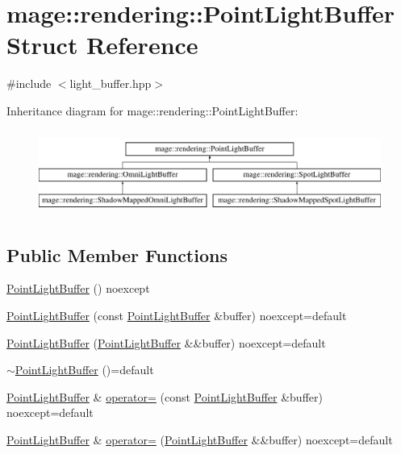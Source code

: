 \hypertarget{structmage_1_1rendering_1_1_point_light_buffer}{}\section{mage\+:\+:rendering\+:\+:Point\+Light\+Buffer Struct Reference}
\label{structmage_1_1rendering_1_1_point_light_buffer}


{\ttfamily \#include $<$light\+\_\+buffer.\+hpp$>$}

Inheritance diagram for mage\+:\+:rendering\+:\+:Point\+Light\+Buffer\+:\begin{figure}[H]
\begin{center}
\leavevmode
\includegraphics[height=2.809365cm]{structmage_1_1rendering_1_1_point_light_buffer}
\end{center}
\end{figure}
\subsection*{Public Member Functions}
\begin{DoxyCompactItemize}
\item 
\mbox{\hyperlink{structmage_1_1rendering_1_1_point_light_buffer_a1b1cfb7f21b62216c1cf827a4b5ecb0b}{Point\+Light\+Buffer}} () noexcept
\item 
\mbox{\hyperlink{structmage_1_1rendering_1_1_point_light_buffer_ae6ba19d082d27864c4547f220f5fbaf5}{Point\+Light\+Buffer}} (const \mbox{\hyperlink{structmage_1_1rendering_1_1_point_light_buffer}{Point\+Light\+Buffer}} \&buffer) noexcept=default
\item 
\mbox{\hyperlink{structmage_1_1rendering_1_1_point_light_buffer_aabaa7e2bfbbf2c43aa2658f363f2c81e}{Point\+Light\+Buffer}} (\mbox{\hyperlink{structmage_1_1rendering_1_1_point_light_buffer}{Point\+Light\+Buffer}} \&\&buffer) noexcept=default
\item 
\mbox{\hyperlink{structmage_1_1rendering_1_1_point_light_buffer_ab96d8eab3de782d20ae4cf239c2d45f9}{$\sim$\+Point\+Light\+Buffer}} ()=default
\item 
\mbox{\hyperlink{structmage_1_1rendering_1_1_point_light_buffer}{Point\+Light\+Buffer}} \& \mbox{\hyperlink{structmage_1_1rendering_1_1_point_light_buffer_a0464569c115507da0733a185e8968c46}{operator=}} (const \mbox{\hyperlink{structmage_1_1rendering_1_1_point_light_buffer}{Point\+Light\+Buffer}} \&buffer) noexcept=default
\item 
\mbox{\hyperlink{structmage_1_1rendering_1_1_point_light_buffer}{Point\+Light\+Buffer}} \& \mbox{\hyperlink{structmage_1_1rendering_1_1_point_light_buffer_a8bdda9a12643bc11f03798ed3e6b49f4}{operator=}} (\mbox{\hyperlink{structmage_1_1rendering_1_1_point_light_buffer}{Point\+Light\+Buffer}} \&\&buffer) noexcept=default
\end{DoxyCompactItemize}
